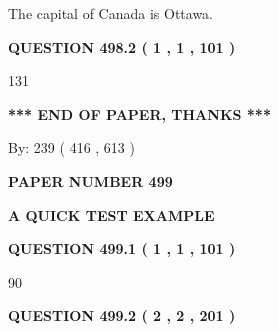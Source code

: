 \documentclass[12pt]{article}
\begin{document}
 
The capital of Canada is Ottawa.
 
 
 
 
  
\vspace{0.2in}
  
{\textbf{\Large{QUESTION
498.2 
 ( 1 , 1 , 101 )
}}}
  
  
 
 
\noindent{}

131
 
 
   
   
 \vspace{0.2in}
 
   
   
   
   
\vspace{1.0in} 
{\textbf{\large{ *** END OF PAPER, THANKS *** }}} 
   
   
\hspace{1.0in} By: 
 239 ( 416 ,  613 )
   
   
   
   
\newpage 
\setcounter{page}{ 
   499001 } 
   
   
   
   
 {\textbf{ \Large{ PAPER NUMBER  499  }}}
   
   
\vspace{0.2in}
   
   
   
   
   
   
 \vspace{0.2in}
{\LARGE {\textbf{ A QUICK TEST EXAMPLE}}}
   
   
  
\vspace{0.2in}
  
{\textbf{\Large{QUESTION
499.1 
 ( 1 , 1 , 101 )
}}}
  
  
 
 
\noindent{}

90
 
 
  
\vspace{0.2in}
  
{\textbf{\Large{QUESTION
499.2 
 ( 2 , 2 , 201 )
}}}
  
\end{document}
